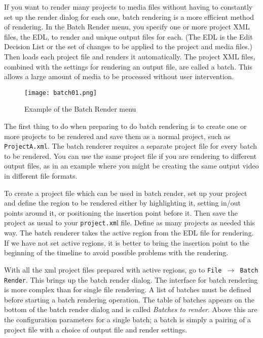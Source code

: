 If you want to render many projects to media files without having to
constantly set up the render dialog for each one, batch rendering is
a more efficient method of rendering.  In the Batch Render menu, you
specify one or more \CGG{} project XML files, the EDL, to render and
unique output files for each. (The EDL is the Edit Decision List or
the set of changes to be applied to the project and media files.)
Then \CGG{} loads each project file and renders it
automatically. The project XML files, combined with the settings for
rendering an output file, are called a batch.  This allows a large
amount of media to be processed without user intervention.

\begin{figure}[htpb] \centering
  \texttt{[image: batch01.png]}
  \caption{Example of the Batch Render menu}
  \label{fig:batch01}
\end{figure}

The first thing to do when preparing to do batch rendering is to
create one or more \CGG{} projects to be rendered and save them as a
normal project, such as \texttt{ProjectA.xml}.  The batch renderer
requires a separate project file for every batch to be rendered.
You can use the same \CGG{} project file if you are rendering to
different output files, as in an example where you might be creating
the same output video in different file formats.

To create a project file which can be used in batch render, set up
your project and define the region to be rendered either by
highlighting it, setting in/out points around it, or positioning the
insertion point before it. Then save the project as usual to your
\texttt{project.xm}l file. Define as many projects as needed this
way.  The batch renderer takes the active region from the EDL file
for rendering. If we have not set active regions, it is better to
bring the insertion point to the beginning of the timeline to avoid
possible problems with the rendering.

With all the \CGG{} xml project files prepared with active regions,
go to \texttt{File $\rightarrow$ Batch Render}. This brings up the
batch render dialog. The interface for batch rendering is more
complex than for single file rendering.  A list of batches must be
defined before starting a batch rendering operation.  The table of
batches appears on the bottom of the batch render dialog and is
called \textit{Batches to render}.  Above this are the configuration
parameters for a single batch; a batch is simply a pairing of a
project file with a choice of output file and render settings.

